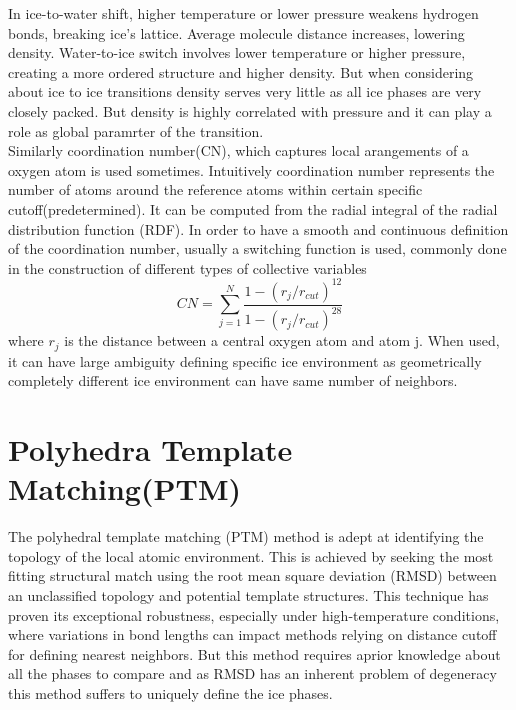In ice-to-water shift, higher temperature or lower pressure weakens hydrogen bonds, breaking ice's lattice. Average molecule distance increases, lowering density. Water-to-ice switch involves lower temperature or higher pressure, creating a more ordered structure and higher density. But when considering about ice to ice transitions density serves very little as all ice phases are very closely packed. But density is highly correlated with pressure and it can play a role as global paramrter of the transition.\\
Similarly coordination number(CN), which captures local arangements of a oxygen atom is used sometimes. Intuitively coordination number represents the number of atoms around the reference atoms within certain specific cutoff(predetermined)\cite{Zimmermann2017}.
It can be computed from the radial integral of the radial distribution function (RDF). In order to have a smooth and continuous definition of the coordination number, usually a switching
function is used, commonly done in the construction of different types of collective variables \cite{Nelson1996} \cite{Bonomi2009}
\[CN = \sum_{j=1}^N \frac{1-(r_j/r_{cut})^{12}}{1-(r_j/r_{cut})^{28}}\] 
where $r_j$ is the distance between a central oxygen atom and atom j.
When used, it can have large ambiguity defining specific ice environment as geometrically completely different ice environment can have same number of neighbors.
\section{Polyhedra Template Matching(PTM)}
The polyhedral template matching (PTM) method is adept at identifying the topology of the local atomic environment\cite{Larsen2016}. This is achieved by seeking the most fitting structural match using the root mean square deviation (RMSD) between an unclassified topology and potential template structures. This technique has proven its exceptional robustness, especially under high-temperature conditions, where variations in bond lengths can impact methods relying on distance cutoff for defining nearest neighbors. But this method requires aprior knowledge about all the phases to compare and as RMSD has an inherent problem of degeneracy this method suffers to uniquely define the ice phases.

